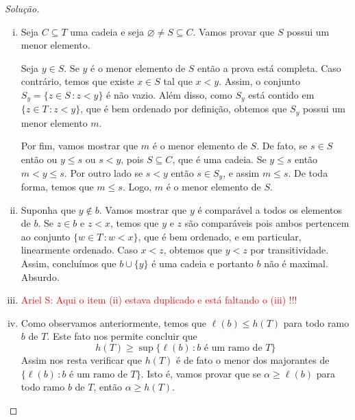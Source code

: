 \documentclass[a4paper]{article}
\begin{document}
  \begin{proof}[Solução]\hfill
    \begin{enumerate}[(i)]
      \item  Seja \(C\subseteq T\) uma cadeia e seja
        \(\varnothing\not = S\subseteq C\). Vamos provar que \(S\) possui um menor
        elemento.

        Seja \(y\in S\). Se \(y\) é o menor elemento de \(S\) então a prova está
        completa. Caso contrário, temos que existe \(x\in S\) tal que \(x<y\). Assim,
         o conjunto \(S_{y} =\{z\in S\,\colon z<y\}\) é não vazio. Além disso, como
         \(S_y\) está contido em \(\{z\in T\,\colon z<y\}\), que é bem ordenado por
         definição, obtemos que \(S_y\) possui um menor elemento \(m\).

         Por fim, vamos mostrar que \(m\) é o menor elemento de \(S\). De fato, se
         \(s\in S\) então ou \(y \leq s\) ou \(s<y\), pois \(S\subseteq C\), que é uma cadeia.
         Se \(y \leq s\) então \(m<y\leq s\). Por outro lado se
         \(s<y\) então \(s\in S_{y}\), e assim \(m\leq s\). De toda forma, temos que
         \(m\leq s\). Logo,  \(m\) é o menor elemento de \(S\).

       \item Suponha que \(y\not\in b\). Vamos mostrar que \(y\) é comparável
        a todos os elementos de \(b\). Se \(z\in b\) e \(z < x\), temos que
        \(y\) e \(z\) são comparáveis pois ambos pertencem ao conjunto \(\{w\in
        T\,\colon w< x \}\), que é bem ordenado, e em particular, linearmente
        ordenado. Caso \(x<z\), obtemos que \(y<z\) por transitividade. Assim,
        concluímos que \(b\cup\{y\}\) é uma cadeia e portanto \(b\) não é
        maximal. Absurdo.

        \item \textcolor{red}{Ariel S: Aqui o item (ii) estava duplicado e está
            faltando o (iii) !!!}
        
      \item Como observamos anteriormente, temos que  \(\ell (b)\leq h(T)\) para
        todo ramo \(b\) de \(T\). Este fato nos permite concluir que
        \[h(T)\geq\sup\{\ell(b)\,\colon b \text{ é um ramo de } T\}\]
        Assim nos resta verificar que \(h(T)\) é de fato o menor dos majorantes
         de \(\{\ell(b)\,\colon b \text{ é um ramo de } T\}\). Isto é, vamos
         provar que se \(\alpha\geq  \ell (b)\)
        para todo ramo \(b\) de \(T\), então \(\alpha\geq h(T)\).


\end{enumerate}
\end{proof}
\end{document}
